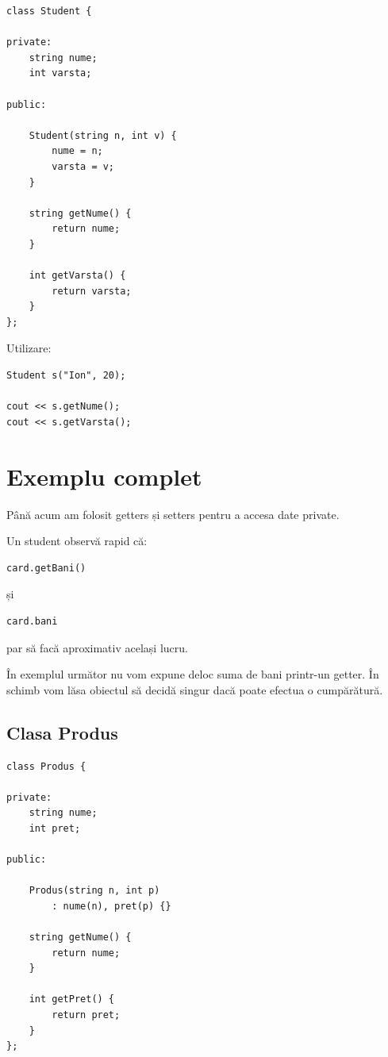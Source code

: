 \documentclass[12pt,a4paper]{article}
\begin{document}
\begin{lstlisting}
class Student {

private:
    string nume;
    int varsta;

public:

    Student(string n, int v) {
        nume = n;
        varsta = v;
    }

    string getNume() {
        return nume;
    }

    int getVarsta() {
        return varsta;
    }
};
\end{lstlisting}

Utilizare:

\begin{lstlisting}
Student s("Ion", 20);

cout << s.getNume();
cout << s.getVarsta();
\end{lstlisting}

\newpage

\section{Exemplu complet}

Până acum am folosit getters și setters pentru a accesa date private.

Un student observă rapid că:

\begin{lstlisting}
card.getBani()
\end{lstlisting}

și

\begin{lstlisting}
card.bani
\end{lstlisting}

par să facă aproximativ același lucru.

În exemplul următor nu vom expune deloc suma de bani printr-un getter. În schimb vom lăsa obiectul să decidă singur dacă poate efectua o cumpărătură.

\subsection{Clasa Produs}

\begin{lstlisting}
class Produs {

private:
    string nume;
    int pret;

public:

    Produs(string n, int p)
        : nume(n), pret(p) {}

    string getNume() {
        return nume;
    }

    int getPret() {
        return pret;
    }
};
\end{lstlisting}
\end{document}
